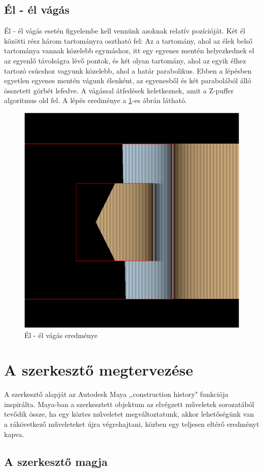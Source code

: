 \subsection{Él - él vágás}
Él - él vágás esetén figyelembe kell vennünk azoknak relatív pozícióját. Két él közötti rész három tartományra osztható fel: Az a tartomány, ahol az élek belső tartománya vannak közelebb egymáshoz, itt egy egyenes mentén helyezkednek el az egyenlő távolságra lévő pontok, és két olyan tartomány, ahol az egyik élhez tartozó csúcshoz vagyunk közelebb, ahol a határ parabolikus. Ebben a lépésben egyetlen egyenes mentén vágunk élenként, az egyenesből és két parabolából álló összetett görbét lefedve. A vágással átfedések keletkeznek, amit a Z-puffer algoritmus old fel. A lépés eredménye a \ref{fig:segment_segment_cut-1}-es ábrán látható.

\begin{figure}[H]
    \centering
    \includegraphics[width=.55\linewidth]{images/segment_segment_cut.png}
    \caption{Él - él vágás eredménye}
    \label{fig:segment_segment_cut-1}
\end{figure}

\section{A szerkesztő megtervezése}
A szerkesztő alapját az Autodesk Maya ,,construction history" funkciója inspirálta. Maya-ban a szerkesztett objektum az elvégzett műveletek sorozatából tevődik össze, ha egy köztes műveletet megváltoztatunk, akkor lehetőségünk van a rákövetkező műveleteket újra végrehajtani, közben egy teljesen eltérő eredményt kapva.

\subsection{A szerkesztő magja}

